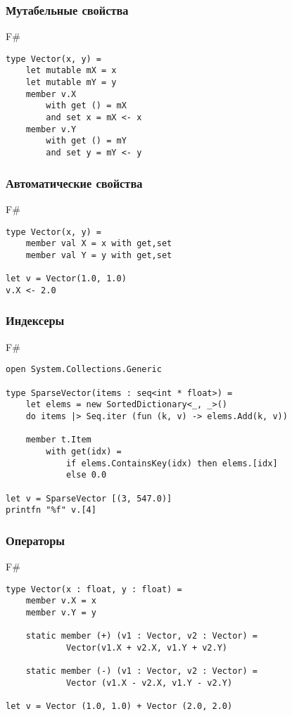 \documentclass[xetex,mathserif,serif]{beamer}
\begin{document}
   	\begin{frame}[fragile]
   		\frametitle{Мутабельные свойства}
   		\begin{exampleblock}{F\#}
   			\begin{lstlisting}
type Vector(x, y) = 
    let mutable mX = x
    let mutable mY = y
    member v.X 
        with get () = mX
        and set x = mX <- x
    member v.Y
        with get () = mY
        and set y = mY <- y
\end{lstlisting}
\end{exampleblock}
\end{frame}

   	\begin{frame}[fragile]
   		\frametitle{Автоматические свойства}
   		\begin{exampleblock}{F\#}
   			\begin{lstlisting}
type Vector(x, y) = 
    member val X = x with get,set
    member val Y = y with get,set

let v = Vector(1.0, 1.0)
v.X <- 2.0
\end{lstlisting}
\end{exampleblock}
\end{frame}

   	\begin{frame}[fragile]
   		\frametitle{Индексеры}
   		\begin{exampleblock}{F\#}
   			\begin{lstlisting}
open System.Collections.Generic

type SparseVector(items : seq<int * float>) =
    let elems = new SortedDictionary<_, _>()
    do items |> Seq.iter (fun (k, v) -> elems.Add(k, v))

    member t.Item
        with get(idx) =
            if elems.ContainsKey(idx) then elems.[idx]
            else 0.0
            
let v = SparseVector [(3, 547.0)]
printfn "%f" v.[4]
\end{lstlisting}
\end{exampleblock}
\end{frame}

   	\begin{frame}[fragile]
   		\frametitle{Операторы}
   		\begin{exampleblock}{F\#}
   			\begin{lstlisting}
type Vector(x : float, y : float) =
    member v.X = x
    member v.Y = y

    static member (+) (v1 : Vector, v2 : Vector) =
            Vector(v1.X + v2.X, v1.Y + v2.Y)

    static member (-) (v1 : Vector, v2 : Vector) =
            Vector (v1.X - v2.X, v1.Y - v2.Y)

let v = Vector (1.0, 1.0) + Vector (2.0, 2.0)
\end{lstlisting}
\end{exampleblock}
\end{frame}
\end{document}
